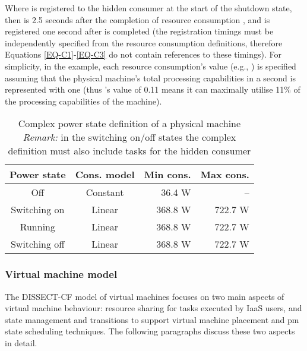 \documentclass[sort, compress, 5p]{elsarticle}
\begin{document}
Where  is registered to the hidden consumer at the start of the shutdown state, then  is 2.5 seconds after the completion of resource consumption , and  is registered one second after  is completed (the registration timings must be independently specified from the resource consumption definitions, therefore Equations \ref{EQ-C1}-\ref{EQ-C3} do not contain references to these timings). For simplicity, in the example, each resource consumption's  value (e.g., ) is specified assuming that the physical machine's total processing capabilities in a second is represented with one (thus 's value of 0.11 means it can maximally utilise 11\% of the processing capabilities of the machine).

\begin{table}[tb]
\centering
\caption{Complex power state definition of a physical machine \\
{\footnotesize \emph{Remark:} in the switching on/off states the complex definition must also include tasks for the hidden consumer}
\label{TAB-COMPLEX}}
\begin{tabular}{ccrr}
Power state & Cons. model & Min cons. & Max cons. \\
\hline
Off & Constant & 36.4 W & -- \\
Switching on & Linear &368.8 W & 722.7 W\\
Running & Linear & 368.8 W & 722.7 W\\
Switching off & Linear & 368.8 W & 722.7 W\\
\hline
\end{tabular}
\end{table}

\subsubsection{Virtual machine model}

The DISSECT-CF model of virtual machines focuses on two main aspects of virtual machine behaviour:  resource sharing for tasks executed by IaaS users, and  state management and transitions to support virtual machine placement and pm state scheduling techniques. The following paragraphs discuss these two aspects in detail.
\end{document}
